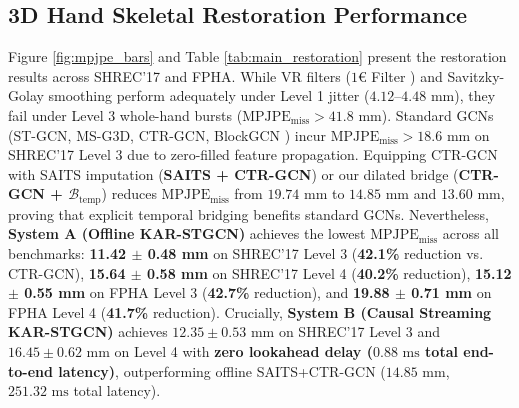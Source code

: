 \documentclass[10pt,twocolumn]{article}
\begin{document}
\subsection{3D Hand Skeletal Restoration Performance}
Figure \ref{fig:mpjpe_bars} and Table \ref{tab:main_restoration} present the restoration results across SHREC'17 and FPHA. While VR filters ($1\text{€}$ Filter \cite{casiez2012oneeuro}) and Savitzky-Golay smoothing perform adequately under Level 1 jitter ($4.12\text{--}4.48\text{ mm}$), they fail under Level 3 whole-hand bursts ($\text{MPJPE}_{\text{miss}} > 41.8\text{ mm}$). Standard GCNs (ST-GCN, MS-G3D, CTR-GCN, BlockGCN \cite{zhou2024blockgcn}) incur $\text{MPJPE}_{\text{miss}} > 18.6\text{ mm}$ on SHREC'17 Level 3 due to zero-filled feature propagation. Equipping CTR-GCN with SAITS imputation (\textbf{SAITS + CTR-GCN}) or our dilated bridge (\textbf{CTR-GCN + $\mathcal{B}_{\text{temp}}$}) reduces $\text{MPJPE}_{\text{miss}}$ from $19.74\text{ mm}$ to $14.85\text{ mm}$ and $13.60\text{ mm}$, proving that explicit temporal bridging benefits standard GCNs. Nevertheless, \textbf{System A (Offline KAR-STGCN)} achieves the lowest $\text{MPJPE}_{\text{miss}}$ across all benchmarks: \textbf{11.42 $\pm$ 0.48 mm} on SHREC'17 Level 3 (\textbf{42.1\%} reduction vs. CTR-GCN), \textbf{15.64 $\pm$ 0.58 mm} on SHREC'17 Level 4 (\textbf{40.2\%} reduction), \textbf{15.12 $\pm$ 0.55 mm} on FPHA Level 3 (\textbf{42.7\%} reduction), and \textbf{19.88 $\pm$ 0.71 mm} on FPHA Level 4 (\textbf{41.7\%} reduction). Crucially, \textbf{System B (Causal Streaming KAR-STGCN)} achieves $12.35 \pm 0.53\text{ mm}$ on SHREC'17 Level 3 and $16.45 \pm 0.62\text{ mm}$ on Level 4 with \textbf{zero lookahead delay ($0.88\text{ ms}$ total end-to-end latency)}, outperforming offline SAITS+CTR-GCN ($14.85\text{ mm}$, $251.32\text{ ms}$ total latency).
\end{document}
